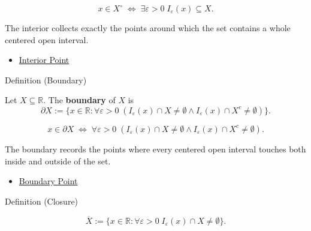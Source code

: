 \begin{remark*}
\[
  x\in X^\circ\;\Longleftrightarrow\;\exists\varepsilon>0\;I_\varepsilon(x)\subseteq X.
\]
\end{remark*}

\begin{remark*}[Interpretation]
The interior collects exactly the points around which the set contains a
whole centered open interval.
\end{remark*}

\begin{dependencies}
\begin{itemize}
  \item \hyperref[def:interior-point-r]{Interior Point}
\end{itemize}
\end{dependencies}

\begin{definitionbox}{Definition (Boundary)}
\begin{definition}[Boundary]
\label{def:boundary-r}
Let $X\subseteq\mathbb{R}$. The \textbf{boundary} of $X$ is
\[
  \partial X:=\{x\in\mathbb{R}:\forall\varepsilon>0\;(I_\varepsilon(x)\cap X\neq\emptyset\wedge I_\varepsilon(x)\cap X^c\neq\emptyset)\}.
\]
\end{definition}
\end{definitionbox}

\begin{remark*}
\[
  x\in\partial X\;\Longleftrightarrow\;
  \forall\varepsilon>0\;(I_\varepsilon(x)\cap X\neq\emptyset\wedge I_\varepsilon(x)\cap X^c\neq\emptyset).
\]
\end{remark*}

\begin{remark*}[Interpretation]
The boundary records the points where every centered open interval touches both
inside and outside of the set.
\end{remark*}

\begin{dependencies}
\begin{itemize}
  \item \hyperref[def:boundary-point-r]{Boundary Point}
\end{itemize}
\end{dependencies}

\begin{definitionbox}{Definition (Closure)}
\begin{definition}[Closure]
\label{def:closure-r}
\[
\overline{X}
:=
\{x\in\mathbb{R}:\forall\varepsilon>0\;I_\varepsilon(x)\cap X\neq\emptyset\}.
\]
\end{definition}
\end{definitionbox}

